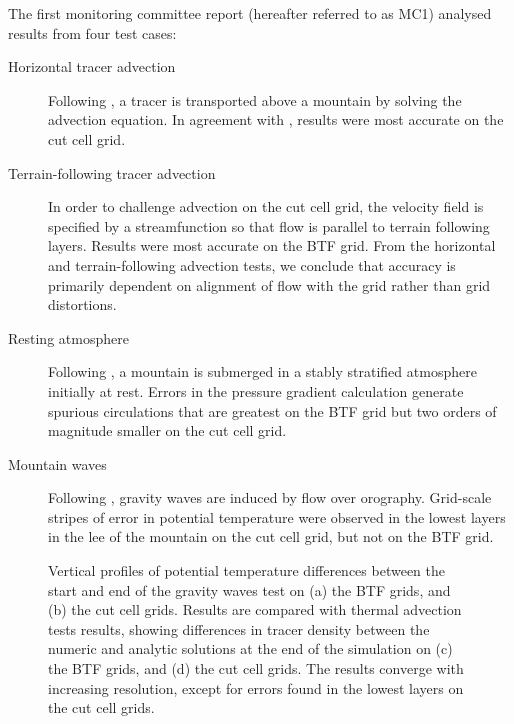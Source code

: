 \documentclass[a4paper]{article}
\begin{document}
The first monitoring committee report (hereafter referred to as MC1) analysed results from four test cases:
\begin{description}
	\item[Horizontal tracer advection]{Following \citet{schaer2002}, a tracer is transported above a mountain by solving the advection equation.  In agreement with \citet{good2014}, results were most accurate on the cut cell grid.}
	\item[Terrain-following tracer advection]{In order to challenge advection on the cut cell grid, the velocity field is specified by a streamfunction so that flow is parallel to terrain following layers.  Results were most accurate on the BTF grid.  From the horizontal and terrain-following advection tests, we conclude that accuracy is primarily dependent on alignment of flow with the grid rather than grid distortions.}
	\item[Resting atmosphere]{Following \citet{klemp2011}, a mountain is submerged in a stably stratified atmosphere initially at rest.  Errors in the pressure gradient calculation generate spurious circulations that are greatest on the BTF grid but two orders of magnitude smaller on the cut cell grid.}
	\item[Mountain waves]{Following \citet{schaer2002}, gravity waves are induced by flow over orography.  Grid-scale stripes of error in potential temperature were observed in the lowest layers in the lee of the mountain on the cut cell grid, but not on the BTF grid.}
\end{description}

\begin{figure}
	\centering
	\footnotesize
	
%
	\caption{Vertical profiles of potential temperature differences between the start and end of the gravity waves test on (a) the BTF grids, and (b) the cut cell grids.  Results are compared with thermal advection tests results, showing differences in tracer density between the numeric and analytic solutions at the end of the simulation on (c) the BTF grids, and (d) the cut cell grids.  The results converge with increasing resolution, except for errors found in the lowest layers on the cut cell grids.}
	\label{fig:sampleLines}
\end{figure}
\end{document}

